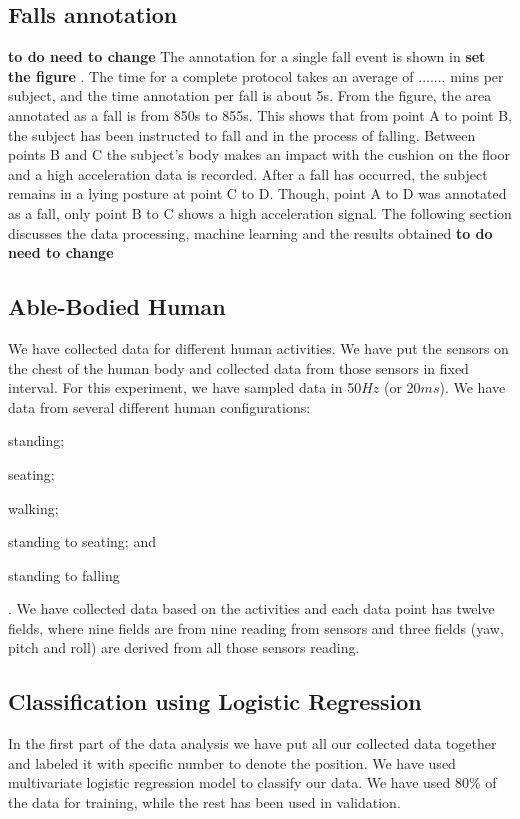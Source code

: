 \documentclass[letterpaper]{article}
\begin{document}
\subsection{Falls annotation}
\textbf{to do need to change}
The annotation for a single fall event is shown in \textbf{{set the figure} }. The time for a complete protocol takes an average of ....... mins
per subject, and the time annotation per fall is about 5s. From
the figure, the area annotated as a fall is from 850s to 855s.
This shows that from point A to point B, the subject has been
instructed to fall and in the process of falling. Between points
B and C the subject’s body makes an impact with the cushion
on the floor and a high acceleration data is recorded. After a
fall has occurred, the subject remains in a lying posture at point
C to D. Though, point A to D was annotated as a fall, only
point B to C shows a high acceleration signal. The following
section discusses the data processing, machine learning and
the results obtained
\textbf{to do need to change}

\subsection{Able-Bodied Human}


We have collected data for different human activities. We have put the sensors on the chest of the
human body and collected data from those sensors in fixed interval. For this experiment, we have
sampled data in 50$Hz$ (or 20$ms$). We have data from several different human configurations:
\begin{inparaenum}[(1)] \item standing; \item seating; \item walking; \item standing to seating;
and \item standing to falling\end{inparaenum}. We have collected data based on the activities and
each data point has twelve fields, where nine fields are from nine reading from sensors and three
fields (yaw, pitch and roll) are derived from all those sensors reading.

\subsection*{Classification using Logistic Regression}

In the first part of the data analysis we have put all our collected data together and labeled it
with specific number to denote the position. We have used multivariate logistic regression model to
classify our data. We have used 80\% of the data for training, while the rest has been used
in validation.
\end{document}
